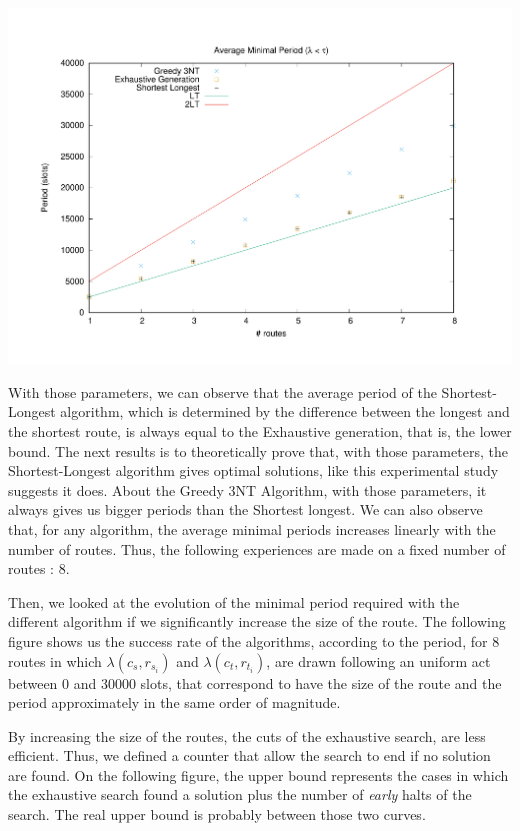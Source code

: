 \documentclass[a4paper,10pt]{article}
\begin{document}
      \begin{center}
      \includegraphics[scale=0.4]{periode_petite.pdf}
      \end{center}
     

      
     
      With those parameters, we can observe that the average period of the Shortest-Longest algorithm, which is determined by the difference between the longest and the shortest route, is always equal to the Exhaustive generation, that is, the lower bound.
      The next results is to theoretically prove that, with those parameters, the Shortest-Longest algorithm gives optimal solutions, like this experimental study suggests it does. 
      About the Greedy 3NT Algorithm, with those parameters, it always gives us bigger periods than the Shortest longest. 
      We can also observe that, for any algorithm, the average minimal periods increases linearly with the number of routes. Thus, the following experiences are made on a fixed number of routes : 8.
      
      Then, we looked at the evolution of the minimal period required with the different algorithm if we significantly increase the size of the route. The following figure shows us the success rate of the algorithms, according to the period, for 8 routes in which  $\lambda(c_s,r_{s_i})$ and $\lambda(c_t,r_{t_i})$, are drawn following an uniform act between 0 and 30000 slots, that correspond to have the size of the route and the period approximately in the same order of magnitude.
      
      By increasing the size of the routes, the cuts of the exhaustive search, are less efficient. Thus, we defined a counter that allow the search to end if no solution are found. On the following figure, the upper bound represents the cases in which the exhaustive search found a solution plus the number of {\em early} halts of the search. The real upper bound is probably between those two curves.
      
\end{document}
